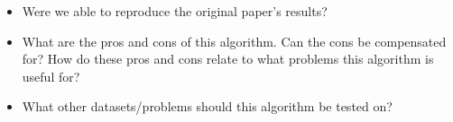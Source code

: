 \begin{itemize}
    \item Were we able to reproduce the original paper's results?
    \item What are the pros and cons of this algorithm. Can the cons be compensated for? How do these pros and cons relate to what problems this algorithm is useful for?
    \item What other datasets/problems should this algorithm be tested on?
\end{itemize}